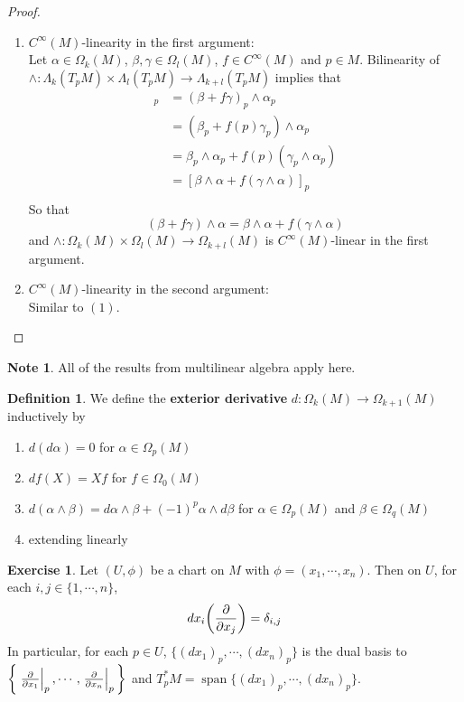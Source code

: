 \documentclass[12pt]{amsart}
\theoremstyle{definition}
\newtheorem{defn}[definition]{Definition}
\newtheorem{note}[definition]{Note}
\theoremstyle{definition}
\newtheorem{ex}[definition]{Exercise}
\newcommand{\al}{\alpha}
\newcommand{\gam}{\gamma}
\newcommand{\bet}{\beta}
\newcommand{\del}{\delta}
\newcommand{\Lam}{\Lambda}
\newcommand{\Om}{\Omega}
\DeclareMathOperator{\spn}{span}
\begin{document}
	\begin{proof}\
	\begin{enumerate}
	\item 
	$C^{\infty}(M)$-linearity in the first argument:\\
	Let $\al \in \Om_k(M)$, $\bet, \gam \in \Om_l(M)$, $f \in C^{\infty}(M)$ and $p \in M$. Bilinearity of $\wedge: \Lam_k(T_pM) \times \Lam_l(T_pM) \rightarrow \Lam_{k+l}(T_pM)$ implies that
	\begin{align*}
	[(\bet + f \gam ) \wedge \al]_p 
	&= (\bet + f \gam)_p \wedge \al_p  \\
	&=(\bet_p + f(p) \gam_p) \wedge \al_p \\
	&= \bet_p \wedge \al_p + f(p)( \gam_p \wedge \al_p) \\
	&=  [\bet \wedge \al + f (\gam \wedge \al)]_p \\
	\end{align*}
	So that $$(\bet + f \gam ) \wedge \al = \bet \wedge \al  + f  (\gam \wedge \al)$$ and $\wedge: \Om_k(M) \times \Om_l(M) \rightarrow \Om_{k+l}(M) $ is $C^{\infty}(M)$-linear in the first argument. 
	\item $C^{\infty}(M)$-linearity in the second argument:\\
	Similar to $(1)$.
	\end{enumerate}
	\end{proof}
	
	\begin{note}
		All of the results from multilinear algebra apply here.
	\end{note}

	\begin{defn}
		We define the \textbf{exterior derivative} $d: \Om_k(M) \rightarrow \Om_{k+1}(M)$ inductively by 
		\begin{enumerate}
			\item $d(d \al) = 0$ for $\al \in \Om_p(M)$
			\item $df(X) = Xf$ for $f \in \Om_0(M)$
			\item $d(\al \wedge \bet) = d\al \wedge \bet + (-1)^p \al \wedge d\bet$ for $\al \in \Om_p(M)$ and $\bet \in \Om_q(M)$
			\item extending linearly
		\end{enumerate}
	\end{defn}

	\begin{ex}
		Let $(U, \phi)$ be a chart on $M$ with $\phi = (x_1, \cdots, x_n)$. Then on $U$, for each $i,j \in \{1, \cdots, n\}$, $$dx_i\bigg(\pdv{x_j} \bigg) = \del_{i,j}$$ 
		In particular, for each $p \in U$, $\{(dx_1)_p, \cdots, (dx_n)_p \}$ is the dual basis to $\bigg \{ \eval{\pdv{x_1}}_{p}, \cdots, \eval{\pdv{x_n}}_{p} \bigg \}$ and $T_p^*M = \spn\{(dx_1)_p, \cdots, (dx_n)_p\}$.
	\end{ex}
\end{document}
